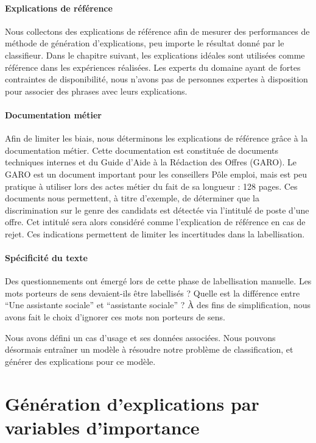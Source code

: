 \paragraph{Explications de référence} Nous collectons des explications de référence afin de mesurer des performances de méthode de génération d'explications, peu importe le résultat donné par le classifieur. Dans le chapitre suivant, les explications idéales sont utilisées comme référence dans les expériences réalisées.
Les experts du domaine ayant de fortes contraintes de disponibilité, nous n'avons pas de personnes expertes à disposition pour associer des phrases avec leurs explications.

\paragraph{Documentation métier} Afin de limiter les biais, nous déterminons les explications de référence grâce à la documentation métier. Cette documentation est constituée de documents techniques internes et du Guide d'Aide à la Rédaction des Offres (GARO). Le GARO est un document important pour les conseillers Pôle emploi, mais est peu pratique à utiliser lors des actes métier du fait de sa longueur : 128 pages. Ces documents nous permettent, à titre d'exemple, de déterminer que la discrimination sur le genre des candidats est détectée via l'intitulé de poste d'une offre. Cet intitulé sera alors considéré comme l'explication de référence en cas de rejet. Ces indications permettent de limiter les incertitudes dans la labellisation.

\paragraph{Spécificité du texte} Des questionnements ont émergé lors de cette phase de labellisation manuelle. Les mots porteurs de sens devaient-ils être labellisés ? Quelle est la différence entre ``Une assistante sociale'' et ``assistante sociale'' ? À des fins de simplification, nous avons fait le choix d'ignorer ces mots non porteurs de sens.

\vspace{1cm}
Nous avons défini un cas d'usage et ses données associées. Nous pouvons désormais entraîner un modèle à résoudre notre problème de classification, et générer des explications pour ce modèle.


\section{Génération d'explications par variables d'importance}\label{C2:explications}

